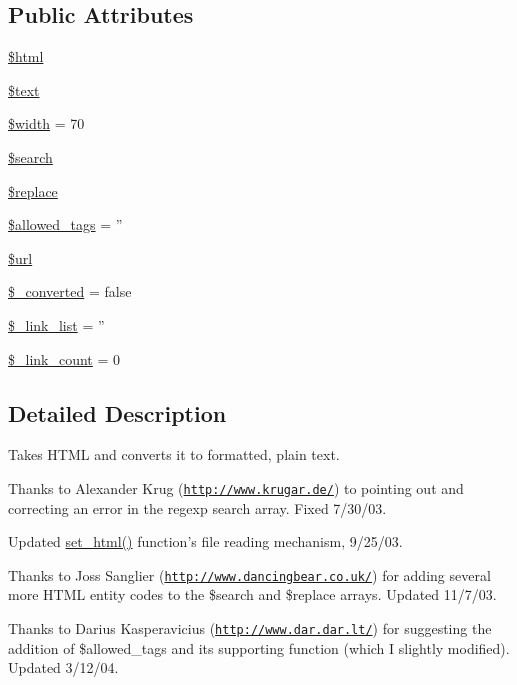 \subsection*{Public Attributes}
\begin{DoxyCompactItemize}
\item 
\hyperlink{classhtml2text_a891f6ae7d8de6312895706453fcda29f}{\$html}
\item 
\hyperlink{classhtml2text_a9f893148949046a51cefad452e88f4ab}{\$text}
\item 
\hyperlink{classhtml2text_a69cdbc42dd33f4215e4a655adaf24989}{\$width} = 70
\item 
\hyperlink{classhtml2text_aa5dbb9c672807ed8c4826b219aa2f22e}{\$search}
\item 
\hyperlink{classhtml2text_ab84fb8261392ce0f0d329dbffd0dc848}{\$replace}
\item 
\hyperlink{classhtml2text_a062ee8ef94be7191ef9dda3dba416891}{\$allowed\-\_\-tags} = ''
\item 
\hyperlink{classhtml2text_a2064bd23eca4e7eeb207ba23ca91613b}{\$url}
\item 
\hyperlink{classhtml2text_a98248146d367395beda0a99dce560690}{\$\-\_\-converted} = false
\item 
\hyperlink{classhtml2text_a2b0a222d507b5cb972acf2d10b4d9d3f}{\$\-\_\-link\-\_\-list} = ''
\item 
\hyperlink{classhtml2text_a12205ffda18f0cd0eb505b4d2332a32c}{\$\-\_\-link\-\_\-count} = 0
\end{DoxyCompactItemize}


\subsection{Detailed Description}
Takes H\-T\-M\-L and converts it to formatted, plain text.

Thanks to Alexander Krug (\href{http://www.krugar.de/}{\tt http\-://www.\-krugar.\-de/}) to pointing out and correcting an error in the regexp search array. Fixed 7/30/03.

Updated \hyperlink{classhtml2text_abf3a1fc2ddd0622eaf181b68991cd382}{set\-\_\-html()} function's file reading mechanism, 9/25/03.

Thanks to Joss Sanglier (\href{http://www.dancingbear.co.uk/}{\tt http\-://www.\-dancingbear.\-co.\-uk/}) for adding several more H\-T\-M\-L entity codes to the \$search and \$replace arrays. Updated 11/7/03.

Thanks to Darius Kasperavicius (\href{http://www.dar.dar.lt/}{\tt http\-://www.\-dar.\-dar.\-lt/}) for suggesting the addition of \$allowed\-\_\-tags and its supporting function (which I slightly modified). Updated 3/12/04.

